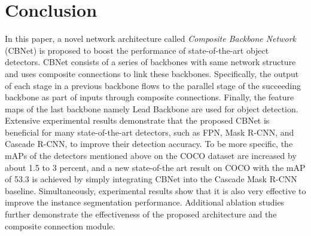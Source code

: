 \documentclass[letterpaper]{article} \usepackage{aaai20}  \usepackage{multirow}
\begin{document}
\section{Conclusion}
\label{section 6}
In this paper, a novel network architecture called \emph{Composite Backbone Network} (CBNet) is proposed to boost the performance of state-of-the-art object detectors. CBNet consists of a series of backbones with same network structure and uses composite connections to link these backbones. Specifically, the output of each stage in a previous backbone flows to the parallel stage of the succeeding backbone as part of inputs through composite connections. Finally, the feature maps of the last backbone namely Lead Backbone are used for object detection.
Extensive experimental results demonstrate that the proposed CBNet is beneficial for many state-of-the-art detectors, such as FPN, Mask R-CNN, and Cascade R-CNN, to improve their detection accuracy. To be more specific, the mAPs of the detectors mentioned above on the COCO dataset are increased by about 1.5 to 3 percent, and a new state-of-the art result on COCO with the mAP of 53.3 is achieved by simply integrating CBNet into the Cascade Mask R-CNN baseline. Simultaneously, experimental results show that it is also very effective to improve the instance segmentation performance. Additional ablation studies further demonstrate the effectiveness of the proposed architecture and the composite connection module.




 

\end{document}
